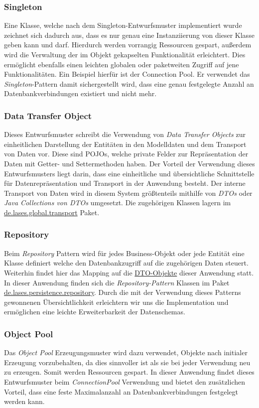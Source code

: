 \subsubsection{Singleton}
Eine Klasse, welche nach dem Singleton-Entwurfsmuster implementiert wurde zeichnet
sich dadurch aus, dass es nur genau eine Instanziierung von dieser Klasse geben
kann und darf. Hierdurch werden vorrangig Ressourcen gespart, außerdem wird die
Verwaltung der im Objekt gekapselten Funktionalität erleichtert. Dies ermöglicht ebenfalls einen
leichten globalen oder paketweiten Zugriff auf jene Funktionalitäten.
Ein Beispiel hierfür ist der Connection Pool. Er verwendet das \emph{Singleton}-Pattern
damit sichergestellt wird, dass
eine genau festgelegte Anzahl an Datenbankverbindungen existiert und nicht mehr.

\subsubsection{Data Transfer Object}
Dieses Entwurfsmuster schreibt die Verwendung von \emph{Data Transfer Objects}
zur einheitlichen Darstellung der Entitäten in den Modelldaten und dem Transport
von Daten vor.
Diese sind POJOs, welche private Felder zur Repräsentation der Daten mit Getter- und
Settermethoden haben.
Der Vorteil der Verwendung dieses Entwurfsmusters liegt darin, dass eine
einheitliche und übersichtliche Schnittstelle für Datenrepräsentation und Transport
in der Anwendung besteht.
Der interne Transport von Daten wird in diesem System größtenteils mithilfe von \emph{DTOs}
oder \emph{Java Collections von DTOs} umgesetzt.
Die zugehörigen Klassen lagern im
\hyperref[arch:transport]{de.lases.global.transport} Paket.

\subsubsection{Repository}
Beim \emph{Repository} Pattern wird für jedes Business-Objekt oder jede Entität
eine Klasse definiert welche den Datenbankzugriff auf die zugehörigen Daten steuert.
Weiterhin findet hier das Mapping auf die \hyperref[arch:transport]{DTO-Objekte} dieser Anwendung statt.
In dieser Anwendung finden sich die \emph{Repository-Pattern} Klassen im Paket
\hyperref[arch:repository]{de.lases.persistence.repository}. Durch die mit
der Verwendung dieses Patterns gewonnenen Übersichtlichkeit erleichtern wir uns die
Implementation und ermöglichen eine leichte Erweiterbarkeit der Datenschemas.

\subsubsection{Object Pool}
Das \emph{Object Pool} Erzeugungsmuster wird dazu verwendet, Objekte nach initialer Erzeugung
vorzubehalten, da dies sinnvoller ist als sie bei jeder Verwendung neu zu erzeugen.
Somit werden Ressourcen gespart. In dieser Anwendung findet dieses Entwurfsmuster
beim \emph{ConnectionPool} %
Verwendung und bietet den zusätzlichen Vorteil, dass eine feste Maximalanzahl an
Datenbankverbindungen festgelegt werden kann.


